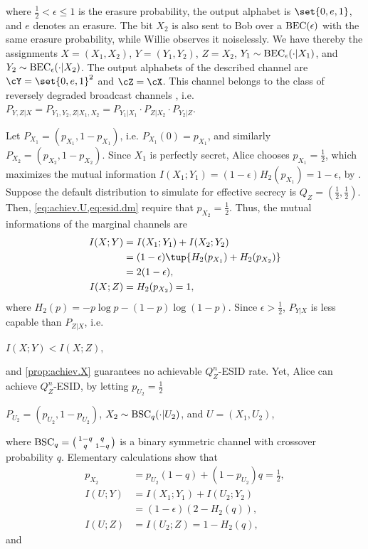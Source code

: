 \documentclass[conference,final]{IEEEtran}
\begin{document}
where $\frac{1}{2} < \epsilon \le 1$
is the erasure probability, the output alphabet
is $\set{0,e,1}$, and $e$ denotes an erasure.
The bit $X_2$ is also sent to Bob over a $\operatorname{BEC}(\epsilon)$ with the same
erasure probability,
while Willie observes it
noiselessly.
We have thereby the assignments
     $X = (X_1, X_2)$,
  $Y = (Y_1, Y_2)$,
  $Z = X_2$,
  $Y_1 \sim \operatorname{BEC}_\epsilon(\cdot|X_1)$, and
  $Y_2 \sim \operatorname{BEC}_\epsilon(\cdot|X_2)$.
The output alphabets of the described channel
are $\cY = \set{0,e,1}^2$ and $\cZ = \cX$.
This channel belongs to the class of reversely degraded broadcast channels \cite[Page 127]{ElGamalKim2011NetworkInformationTheory},
i.e. $P_{Y,Z|X}=P_{Y_1,Y_2,Z|X_1,X_2}=P_{Y_1|X_1}\cdot P_{Z|X_2}\cdot P_{Y_2|Z}$.





Let $P_{X_1} = (p_{X_1}, 1 - p_{X_1})$, i.e. $P_{X_1}(0) = p_{X_1}$,
and similarly $P_{X_2} = (p_{X_2}, 1 - p_{X_2})$.
Since $X_1$ is perfectly secret,
Alice chooses $p_{X_1} = \frac{1}{2}$,
which maximizes the mutual information
$I(X_1; Y_1) = (1-\epsilon) H_2(p_{X_1}) = 1 - \epsilon$,
by \cite[Eq.~(7.15)]{CoverThomas2005ElementsInformationTheory}.
Suppose the default distribution to simulate
for effective secrecy is $Q_Z = (\frac{1}{2}, \frac{1}{2})$.
Then, \cref{eq:achiev.U,eq:esid.dm} require that $p_{X_2} = \frac{1}{2}$.
Thus, the mutual informations of the marginal
channels are
\begin{align}
  I(X; Y)
    & = I(X_1; Y_1) + I(X_2; Y_2)
  \\& = (1-\epsilon) \tup{ H_2(p_{X_1}) + H_2(p_{X_2}) }
  \\& = 2 (1-\epsilon),
  \\
  I(X; Z)
    & = H_2(p_{X_2}) = 1,
\end{align}
where $H_2(p) = -p \log p - (1-p) \log (1-p)$.
Since $\epsilon > \frac{1}{2}$,
$P_{Y|X}$ is less capable than $P_{Z|X}$, i.e.

  $I(X; Y) < I(X; Z),$

and \cref{prop:achiev.X}
guarantees no achievable $Q_Z^n$-ESID rate.
Yet, Alice can achieve
$Q_Z^n$-ESID, by letting $p_{U_2} = \frac{1}{2}$ 

  $P_{U_2}  = (p_{U_2}, 1-p_{U_2})$,
  $X_2  \sim \operatorname{BSC}_q(\cdot|U_2)$,
  and $U    = (X_1, U_2)$,

where
  $\BSC_q =
  \mleft(\begin{smallmatrix}
    1 - q & q \\
    q & 1 - q
  \end{smallmatrix}\mright)
  $
is a binary symmetric channel with crossover probability $q$.
Elementary calculations show that
\begin{align}
  p_{X_2}
    & = p_{U_2} (1 - q) + (1-p_{U_2}) q
    = \frac{1}{2},
  \\
  I(U; Y)
    & = I(X_1; Y_1) + I(U_2; Y_2)
  \\& = (1 - \epsilon) (2 - H_2(q)),
  \\
  I(U; Z)
    & = I(U_2; Z)
   = 1 - H_2(q),
\end{align}
and
\end{document}
